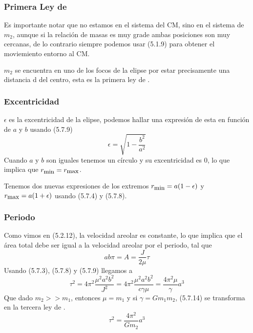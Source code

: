 \subsubsection{Primera Ley de }
Es importante notar que no estamos en el sistema del CM, sino en el sistema de $m_2$, aunque si la relación de masas es muy grade ambas posiciones son muy cercanas, de lo contrario siempre podemos usar (5.1.9) para obtener el moviemiento entorno al CM.

$m_2$ se encuentra en uno de los focos de la elipse por estar precisamente una distancia d del centro, esta es la primera ley de .

\subsubsection{Excentricidad}
$\epsilon$ es la excentricidad de la elipse, podemos hallar una expresión de esta en función de $a$ y $b$ usando (5.7.9)
\begin{equation} \label{5.1.12}
    \epsilon = \sqrt{1-\frac{b^2}{a^2}}
\end{equation} 
Cuando $a$ y $b$ son iguales tenemos un círculo y su excentricidad es 0, lo que implica que $r_{\mbox{\small min}} = r_{\mbox{\small max}}$.

Tenemos dos nuevas expresiones de los extremos $r_{\mbox{\small min}} = a (1-\epsilon) $ y  $r_{\mbox{\small max}} = a (1+\epsilon)$ usando (5.7.4) y (5.7.8).
\subsubsection{Periodo}
Como vimos en (5.2.12), la velocidad areolar es constante, lo que implica que el área total debe ser igual a la velocidad areolar por el periodo, tal que
\begin{equation} \label{5.1.13}
    a b \pi =A = \frac{J}{2 \mu} \tau
\end{equation} 
Usando (5.7.3), (5.7.8) y (5.7.9) llegamos a 
\begin{equation} \label{5.1.14}
    \tau^2 = 4 \pi^2 \frac{\mu^2 a^2 b^2}{J^2} = 4 \pi^2 \frac{\mu^2 a^2 b^2}{c \gamma \mu} =  \frac{4 \pi^2  \mu}{\gamma} a^3
\end{equation} 
Que dado $m_2 >> m_1$, entonces $\mu = m_1$ y si $\gamma = G m_1 m_2 $, (5.7.14) se transforma en la tercera ley de .
\begin{equation} \label{5.1.14}
    \tau^2 =\frac{4 \pi^2}{G m_2} a^3
\end{equation} 

